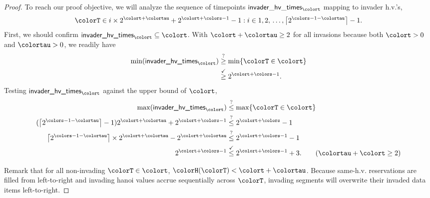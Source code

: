 \begin{proof}
To reach our proof objective, we will analyze the sequence of timepoints $\mathsf{invader\_hv\_times}_{\colort}$ mapping to invader h.v.'s,
\begin{align*}
\colorT \in i \times 2^{\colort + \colortau} +
2^{\colort + \colors - 1} - 1
:
i \in 1,2,\,\ldots,\left\lceil2^{\colors - 1 - \colortau}\right\rceil - 1.
\end{align*}
First, we should confirm $\textsf{invader\_hv\_times}_{\colort} \subseteq \colort$.
With $\colort + \colortau \geq 2$ for all invasions because both $\colort > 0$ and $\colortau > 0$, we readily have
\begin{align*}
\min(\textsf{invader\_hv\_times}_{\colort})
&\stackrel{?}{\geq}
\min\{\colorT \in \colort\}\\
&\stackrel{\checkmark}{\geq}
2^{\colort + \colors - 1}.
\end{align*}
Testing $\textsf{invader\_hv\_times}_{\colort}$ against the upper bound of $\colort$,
\begin{align*}
\max(\textsf{invader\_hv\_times}_{\colort})
&\stackrel{?}{\leq}
\max\{\colorT \in \colort\}
\\
(\left\lceil 2^{\colors - 1 - \colortau} \right\rceil  - 1)
2^{\colort + \colortau} + 2^{\colort + \colors - 1}
&\stackrel{?}{\leq}
2^{\colort + \colors} - 1
\\
\left\lceil 2^{\colors - 1 - \colortau} \right\rceil \times 2^{\colort + \colortau} - 2^{\colort + \colortau}
&\stackrel{?}{\leq}
2^{\colort + \colors - 1} - 1
\\
2^{\colort + \colors - 1}
&\stackrel{\checkmark}{\leq}
2^{\colort + \colors - 1} + 3.
\tag{$\colortau + \colort \geq 2$}
\end{align*}

Remark that for all non-invading $\colorT \in \colort$, $\colorH(\colorT) < \colort + \colortau$.
Because same-h.v. reservations are filled from left-to-right and invading hanoi values accrue sequentially across $\colorT$, invading segments will overwrite their invaded data items left-to-right.
\end{proof}
